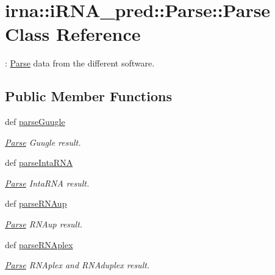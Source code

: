 \hypertarget{classirna_1_1iRNA__pred_1_1Parse_1_1Parse}{
\section{irna\-:\-:i\-R\-N\-A\-\_\-pred\-:\-:\-Parse\-:\-:\-Parse \-Class \-Reference}
\label{classirna_1_1iRNA__pred_1_1Parse_1_1Parse}
}


\-: \hyperlink{classirna_1_1iRNA__pred_1_1Parse_1_1Parse}{\-Parse} data from the different software.  


\subsection*{\-Public \-Member \-Functions}
\begin{DoxyCompactItemize}
\item 
def \hyperlink{classirna_1_1iRNA__pred_1_1Parse_1_1Parse_ab8c95a9a07ac8c69b6811d12aba29bb4}{parse\-Guugle}
\begin{DoxyCompactList}\small\item\em \hyperlink{classirna_1_1iRNA__pred_1_1Parse_1_1Parse}{\-Parse} \-Guugle result. \end{DoxyCompactList}\item 
def \hyperlink{classirna_1_1iRNA__pred_1_1Parse_1_1Parse_a07fe4505c3d3c4133e4d24aaad627c82}{parse\-Inta\-R\-N\-A}
\begin{DoxyCompactList}\small\item\em \hyperlink{classirna_1_1iRNA__pred_1_1Parse_1_1Parse}{\-Parse} \-Inta\-R\-N\-A result. \end{DoxyCompactList}\item 
def \hyperlink{classirna_1_1iRNA__pred_1_1Parse_1_1Parse_aaa2497ba2e116ed228f4a9cb1b8598f8}{parse\-R\-N\-Aup}
\begin{DoxyCompactList}\small\item\em \hyperlink{classirna_1_1iRNA__pred_1_1Parse_1_1Parse}{\-Parse} \-R\-N\-Aup result. \end{DoxyCompactList}\item 
def \hyperlink{classirna_1_1iRNA__pred_1_1Parse_1_1Parse_a8645eb1dd709b755e19c1c74565af971}{parse\-R\-N\-Aplex}
\begin{DoxyCompactList}\small\item\em \hyperlink{classirna_1_1iRNA__pred_1_1Parse_1_1Parse}{\-Parse} \-R\-N\-Aplex and \-R\-N\-Aduplex result. \end{DoxyCompactList}\item 

\end{DoxyCompactItemize}
